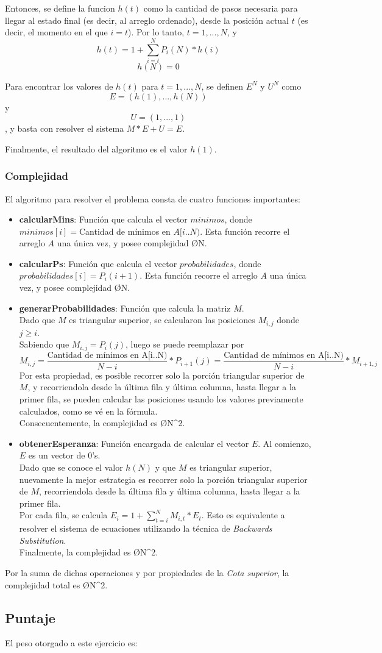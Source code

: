 Entonces, se define la funcion $h(t)$ como la cantidad de pasos necesaria para llegar al estado final (es decir, al arreglo ordenado), desde la posición actual $t$ (es decir, el momento en el que $i = t$). Por lo tanto, $t = 1,...,N$, y
\[ h(t) = 1 + \sum_{i = t}^{N} P_i(N)*h(i) \]
\[ h(N) = 0 \]

Para encontrar los valores de $h(t)$ para $t = 1,...,N$, se definen $E^N$ y $U^N$ como \[ E = (h(1),...,h(N))\] y \[U = (1,...,1) \], y basta con resolver el sistema $M*E + U = E$.

Finalmente, el resultado del algoritmo es el valor $h(1)$.

\subsubsection{Complejidad}
El algoritmo para resolver el problema consta de cuatro funciones importantes:
\begin{itemize}
	\item \textbf{calcularMins}: Función que calcula el vector $minimos$, donde $minimos[i] = $Cantidad de mínimos en $A[i..N)$. Esta función recorre el arreglo $A$ una única vez, y posee complejidad \O{N}.
	\item \textbf{calcularPs}: Función que calcula el vector $probabilidades$, donde $probabilidades[i] = P_i(i+1)$. Esta función recorre el arreglo $A$ una única vez, y posee complejidad \O{N}.
	\item \textbf{generarProbabilidades}: Función que calcula la matriz $M$. \\
	Dado que $M$ es triangular superior, se calcularon las posiciones $M_{i,j}$ donde $j \geq i$. \\
	Sabiendo que $M_{i,j} = P_i(j)$, luego se puede reemplazar por \[ M_{i,j} = \frac{\text{Cantidad de mínimos en A[i..N)}}{N-i} * P_{i+1}(j) = \frac{\text{Cantidad de mínimos en A[i..N)}}{N-i} * M_{i+1,j} \]
	Por esta propiedad, es posible recorrer solo la porción triangular superior de $M$, y recorriendola desde la última fila y última columna, hasta llegar a la primer fila, se pueden calcular las posiciones usando los valores previamente calculados, como se vé en la fórmula.\\
	Consecuentemente, la complejidad es \O{N^2}.
	\item \textbf{obtenerEsperanza}: Función encargada de calcular el vector $E$. Al comienzo, $E$ es un vector de $0$'s. \\
	Dado que se conoce el valor $h(N)$ y que $M$ es triangular superior, nuevamente la mejor estrategia es recorrer solo la porción triangular superior de $M$, recorriendola desde la última fila y última columna, hasta llegar a la primer fila.\\
	Por cada fila, se calcula $E_i = 1 + \sum_{t = i}^{N} M_{i,t}*E_{t}$. Esto es equivalente a resolver el sistema de ecuaciones utilizando la técnica de \emph{Backwards Substitution}\textsuperscript{\cite{backsust}}.\\
	Finalmente, la complejidad es \O{N^2}.
\end{itemize}

\noindent Por la suma de dichas operaciones y por propiedades de la \emph{Cota superior}, la complejidad total es \O{N^2}.

\subsection{Puntaje}
El peso otorgado a este ejercicio es:
